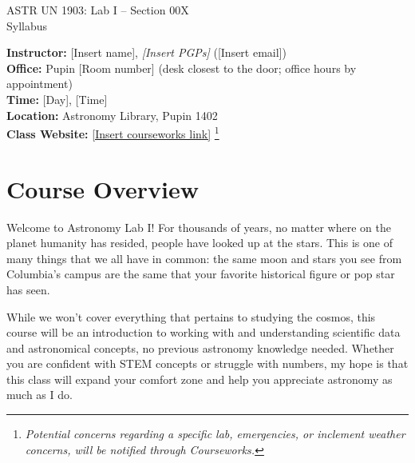 \documentclass[11pt]{article}
\begin{document}
\begin{center}
\LARGE{ASTR UN 1903: Lab I -- Section 00X} \\ \medskip \Large{Syllabus}\\ 
\end{center}

\noindent
\textbf{Instructor:} [Insert name], \textit{[Insert PGPs]} ([Insert email])\\
\textbf{Office:} Pupin [Room number] (desk closest to the door; office hours by appointment)\\ 
\textbf{Time:} {[Day], [Time]} \\
\textbf{Location:} {Astronomy Library, Pupin 1402} \\
\textbf{Class Website:} {\href{https://courseworks2.columbia.edu/courses/200554}{[Insert courseworks link]}} \footnote{\textit{ Potential concerns regarding a specific lab, emergencies, or inclement weather concerns, will be notified through Courseworks.}}

\section*{Course Overview}

Welcome to Astronomy Lab I! For thousands of years, no matter where on the planet humanity has resided, people have looked up at the stars. This is one of many things that we all have in common: the same moon and stars you see from Columbia's campus are the same that your favorite historical figure or pop star has seen. 

While we won't cover everything that pertains to studying the cosmos, this course will be an introduction to working with and understanding scientific data and astronomical concepts, no previous astronomy knowledge needed. Whether you are confident with STEM concepts or struggle with numbers, my hope is that this class will expand your comfort zone and help you appreciate astronomy as much as I do.

\end{document}

